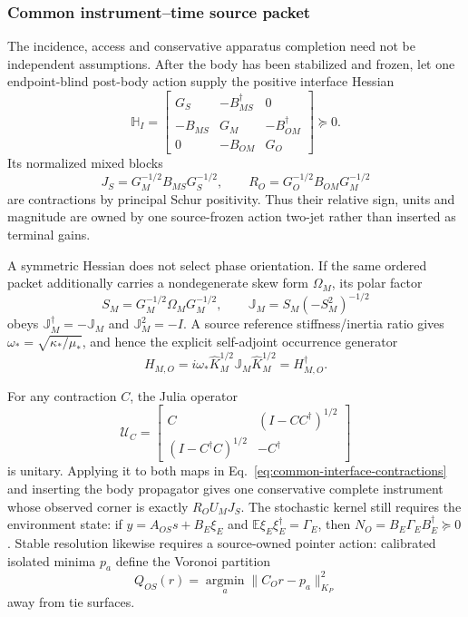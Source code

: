 \documentclass[11pt]{article}
\begin{document}
\subsubsection{Common instrument--time source packet}

The incidence, access and conservative apparatus completion need not be
independent assumptions. After the body has been stabilized and frozen, let
one endpoint-blind post-body action supply the positive interface Hessian
\begin{equation}
 \mathbb H_I=
 \begin{bmatrix}
 G_S&-B_{MS}^\dagger&0\\
 -B_{MS}&G_M&-B_{OM}^\dagger\\
 0&-B_{OM}&G_O
 \end{bmatrix}\succeq0.
 \label{eq:common-interface-hessian}
\end{equation}
Its normalized mixed blocks
\begin{equation}
 J_S=G_M^{-1/2}B_{MS}G_S^{-1/2},\qquad
 R_O=G_O^{-1/2}B_{OM}G_M^{-1/2}
 \label{eq:common-interface-contractions}
\end{equation}
are contractions by principal Schur positivity. Thus their relative sign,
units and magnitude are owned by one source-frozen action two-jet rather than
inserted as terminal gains.

A symmetric Hessian does not select phase orientation. If the same ordered
packet additionally carries a nondegenerate skew form \(\Omega_M\), its polar
factor
\[
 S_M=G_M^{-1/2}\Omega_MG_M^{-1/2},\qquad
 \mathbb J_M=S_M(-S_M^2)^{-1/2}
\]
obeys \(\mathbb J_M^\dagger=-\mathbb J_M\) and
\(\mathbb J_M^2=-I\). A source reference stiffness/inertia ratio gives
\(\omega_*=\sqrt{\kappa_*/\mu_*}\), and hence the explicit self-adjoint
occurrence generator
\begin{equation}
 H_{M,O}=i\omega_*\widehat K_M^{1/2}
 \mathbb J_M\widehat K_M^{1/2}=H_{M,O}^\dagger.
 \label{eq:common-source-occurrence-generator}
\end{equation}

For any contraction \(C\), the Julia operator
\[
 \mathcal U_C=
 \begin{bmatrix}
 C&(I-CC^\dagger)^{1/2}\\
 (I-C^\dagger C)^{1/2}&-C^\dagger
 \end{bmatrix}
\]
is unitary. Applying it to both maps in
Eq.~\eqref{eq:common-interface-contractions} and inserting the body
propagator gives one conservative complete instrument whose observed corner
is exactly \(R_OU_MJ_S\). The stochastic kernel still requires the
environment state: if \(y=A_{OS}s+B_E\xi_E\) and
\(\mathbb E\xi_E\xi_E^\dagger=\Gamma_E\), then
\(N_O=B_E\Gamma_EB_E^\dagger\succeq0\). Stable resolution likewise requires
a source-owned pointer action: calibrated isolated minima \(p_a\) define the
Voronoi partition
\[
 Q_{OS}(r)=\operatorname*{argmin}_a
 \lVert C_Or-p_a\rVert_{K_P}^2
\]
away from tie surfaces.
\end{document}
